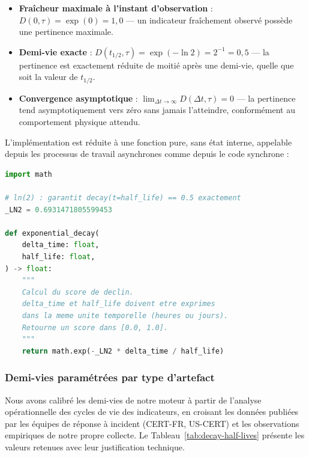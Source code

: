 \begin{itemize}
    \item \textbf{Fraîcheur maximale à l'instant d'observation} : $D(0, \tau) = \exp(0) = 1{,}0$ --- un indicateur fraîchement observé possède une pertinence maximale.
    \item \textbf{Demi-vie exacte} : $D(t_{1/2}, \tau) = \exp(-\ln 2) = 2^{-1} = 0{,}5$ --- la pertinence est exactement réduite de moitié après une demi-vie, quelle que soit la valeur de $t_{1/2}$.
    \item \textbf{Convergence asymptotique} : $\displaystyle\lim_{\Delta t \to \infty} D(\Delta t, \tau) = 0$ --- la pertinence tend asymptotiquement vers zéro sans jamais l'atteindre, conformément au comportement physique attendu.
\end{itemize}

L'implémentation est réduite à une fonction pure, sans état interne, appelable depuis les processus de travail asynchrones comme depuis le code synchrone :

\begin{lstlisting}[language=Python, caption={Fonction de décroissance exponentielle paramétrée par la demi-vie.}, label={lst:decay-func}]
import math

# ln(2) : garantit decay(t=half_life) == 0.5 exactement
_LN2 = 0.6931471805599453

def exponential_decay(
    delta_time: float,
    half_life: float,
) -> float:
    """
    Calcul du score de declin.
    delta_time et half_life doivent etre exprimes
    dans la meme unite temporelle (heures ou jours).
    Retourne un score dans [0.0, 1.0].
    """
    return math.exp(-_LN2 * delta_time / half_life)
\end{lstlisting}

\subsubsection{Demi-vies paramétrées par type d'artefact}

Nous avons calibré les demi-vies de notre moteur à partir de l'analyse opérationnelle des cycles de vie des indicateurs, en croisant les données publiées par les équipes de réponse à incident (CERT-FR, US-CERT) et les observations empiriques de notre propre collecte. Le Tableau~\ref{tab:decay-half-lives} présente les valeurs retenues avec leur justification technique.

